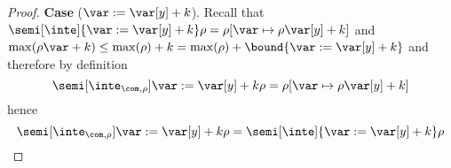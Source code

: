 \begin{proof}
  \medskip

  \noindent
  \textbf{Case} (\(\var := \var[y] + k\)).
  Recall that
  \({\semi[\inte]{\var := \var[y] + k}\rho} = {\rho[\var \mapsto
    \rho\var[y] + k]}\) and
  \({\max(\rho\var + k)} \leq {\max(\rho) + k} = {\max(\rho) +
    \bound{\var := \var[y] + k}}\)
  and therefore by definition
  \begin{equation*}
    \semi[\inte_{\com,\rho}]{\var := \var[y] + k}\rho = \rho[\var \mapsto \rho\var[y] + k]
  \end{equation*}
  hence
  \begin{equation*}
    \semi[\inte_{\com,\rho}]{\var := \var[y] + k}\rho = \semi[\inte]{\var := \var[y] + k}\rho
  \end{equation*}

  \medskip


\end{proof}
